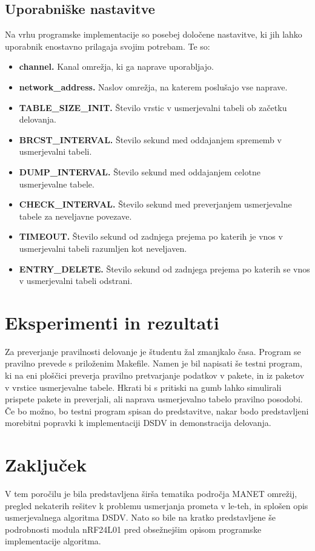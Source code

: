 \subsection{Uporabniške nastavitve}
Na vrhu programske implementacije so posebej določene nastavitve, ki jih lahko uporabnik enostavno prilagaja svojim potrebam. Te so:
\begin{itemize}
  \item \textbf{channel.} Kanal omrežja, ki ga naprave uporabljajo.
  \item \textbf{network\_address.} Naslov omrežja, na katerem poslušajo vse naprave.
  \item \textbf{TABLE\_SIZE\_INIT.} Število vrstic v usmerjevalni tabeli ob začetku delovanja.
  \item \textbf{BRCST\_INTERVAL.} Število sekund med oddajanjem sprememb v usmerjevalni tabeli.
  \item \textbf{DUMP\_INTERVAL.} Število sekund med oddajanjem celotne usmerjevalne tabele.
  \item \textbf{CHECK\_INTERVAL.} Število sekund med preverjanjem usmerjevalne tabele za neveljavne povezave.
  \item \textbf{TIMEOUT.} Število sekund od zadnjega prejema po katerih je vnos v usmerjevalni tabeli razumljen kot neveljaven.
  \item \textbf{ENTRY\_DELETE.} Število sekund od zadnjega prejema po katerih se vnos v usmerjevalni tabeli odstrani.
\end{itemize}

\section{Eksperimenti in rezultati}
Za preverjanje pravilnosti delovanje je študentu žal zmanjkalo časa. Program se pravilno prevede s priloženim Makefile. Namen je bil napisati še testni program, ki na eni ploščici preverja pravilno pretvarjanje podatkov v pakete, in iz paketov v vrstice usmerjevalne tabele. Hkrati bi s pritiski na gumb lahko simulirali prispete pakete in preverjali, ali naprava usmerjevalno tabelo pravilno posodobi. Če bo možno, bo testni program spisan do predstavitve, nakar bodo predstavljeni morebitni popravki k implementaciji DSDV in demonstracija delovanja.

\section{Zaključek}
V tem poročilu je bila predstavljena širša tematika področja MANET omrežij, pregled nekaterih rešitev k problemu usmerjanja prometa v le-teh, in splošen opis usmerjevalnega algoritma DSDV. Nato so bile na kratko predstavljene še podrobnosti modula nRF24L01 pred obsežnejšim opisom programske implementacije algoritma.


